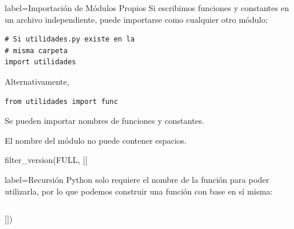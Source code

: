 \begin{contentbox}{label=Importación de Módulos Propios}
    Si escribimos funciones y constantes en un archivo independiente, puede importarse como cualquier otro módulo:
\begin{verbatim}
# Si utilidades.py existe en la
# misma carpeta
import utilidades
\end{verbatim}

Alternativamente,
\begin{verbatim}
from utilidades import func
\end{verbatim}
    
    Se pueden importar nombres de funciones y constantes.
    
    El nombre del módulo no puede contener espacios.
\end{contentbox}

\begin{luacode*}
    filter_version(FULL, [[
    \begin{contentbox}{label=Recursión}
        Python solo requiere el nombre de la función para poder utilizarla, por lo que podemos construir una función con base en sí misma:

        \inputminted{python3}{sample_codes/recursion.py}
    \end{contentbox}
]])
\end{luacode*}
